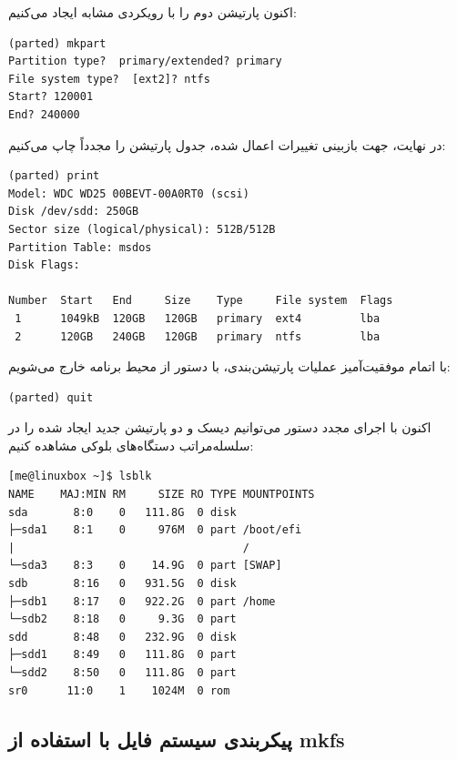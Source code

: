 اکنون پارتیشن دوم را با رویکردی مشابه ایجاد می‌کنیم:

\begin{latin}
\begin{lstlisting}
(parted) mkpart
Partition type?  primary/extended? primary
File system type?  [ext2]? ntfs
Start? 120001
End? 240000
\end{lstlisting}
\end{latin}

در نهایت، جهت بازبینی تغییرات اعمال شده، جدول پارتیشن را مجدداً چاپ می‌کنیم:

\begin{latin}
\begin{lstlisting}
(parted) print
Model: WDC WD25 00BEVT-00A0RT0 (scsi)
Disk /dev/sdd: 250GB
Sector size (logical/physical): 512B/512B
Partition Table: msdos
Disk Flags:

Number  Start   End     Size    Type     File system  Flags
 1      1049kB  120GB   120GB   primary  ext4         lba
 2      120GB   240GB   120GB   primary  ntfs         lba
\end{lstlisting}
\end{latin}

با اتمام موفقیت‌آمیز عملیات پارتیشن‌بندی، با دستور  از محیط برنامه  خارج می‌شویم:

\begin{latin}
\begin{lstlisting}
(parted) quit
\end{lstlisting}
\end{latin}

اکنون با اجرای مجدد دستور  می‌توانیم دیسک و دو پارتیشن جدید ایجاد شده را در سلسله‌مراتب دستگاه‌های بلوکی مشاهده کنیم:

\begin{latin}
\begin{lstlisting}
[me@linuxbox ~]$ lsblk
NAME    MAJ:MIN RM     SIZE RO TYPE MOUNTPOINTS
sda       8:0    0   111.8G  0 disk
├─sda1    8:1    0     976M  0 part /boot/efi
|                                   /
└─sda3    8:3    0    14.9G  0 part [SWAP]
sdb       8:16   0   931.5G  0 disk
├─sdb1    8:17   0   922.2G  0 part /home
└─sdb2    8:18   0     9.3G  0 part
sdd       8:48   0   232.9G  0 disk
├─sdd1    8:49   0   111.8G  0 part
└─sdd2    8:50   0   111.8G  0 part
sr0      11:0    1    1024M  0 rom
\end{lstlisting}
\end{latin}

\subsection{پیکربندی سیستم فایل با استفاده از mkfs}

